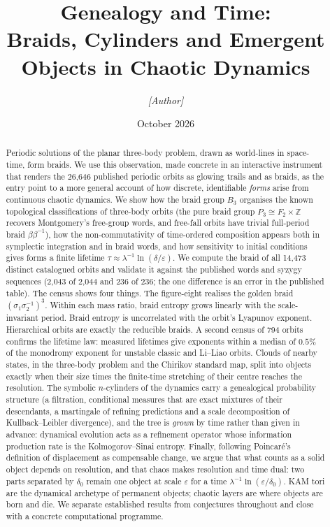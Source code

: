 \documentclass[11pt]{article}
\title{Genealogy and Time:\\[4pt]
\large Braids, Cylinders and Emergent Objects in Chaotic Dynamics}
\author{\textit{[Author]}}
\date{October 2026}
\theoremstyle{remark}
\newcommand{\Z}{\mathbb{Z}}
\begin{document}
\maketitle

\begin{abstract}
Periodic solutions of the planar three-body problem, drawn as world-lines in space-time, form braids.
We use this observation, made concrete in an interactive instrument that renders the 26{,}646 published
periodic orbits as glowing trails and as braids, as the entry point to a more general account of how
discrete, identifiable \emph{forms} arise from continuous chaotic dynamics.
We show how the braid group $B_3$ organises the known topological classifications of three-body orbits
(the pure braid group $P_3\cong F_2\times\Z$ recovers Montgomery's free-group words, and free-fall orbits
have trivial full-period braid $\beta\beta^{-1}$), how the non-commutativity of time-ordered composition
appears both in symplectic integration and in braid words, and how sensitivity to initial conditions gives
forms a finite lifetime $\tau\approx\lambda^{-1}\ln(\delta/\varepsilon)$.
We compute the braid of all 14{,}473 distinct catalogued orbits and validate it against the published words and
syzygy sequences (2{,}043 of 2{,}044 and 236 of 236; the one difference is an error in the published table).
The census shows four things. The figure-eight realises the golden braid $(\sigma_1\sigma_2^{-1})^3$. Within each
mass ratio, braid entropy grows linearly with the scale-invariant period. Braid entropy is uncorrelated with the
orbit's Lyapunov exponent. Hierarchical orbits are exactly the reducible braids.
A second census of 794 orbits confirms the lifetime law: measured lifetimes give exponents within a median of
$0.5\%$ of the monodromy exponent for unstable classic and Li--Liao orbits.
Clouds of nearby states, in the three-body problem and the Chirikov standard map, split into objects exactly when
their size times the finite-time stretching of their centre reaches the resolution.
The symbolic $n$-cylinders of the dynamics carry a genealogical probability structure (a filtration,
conditional measures that are exact mixtures of their descendants, a martingale of refining predictions and
a scale decomposition of Kullback--Leibler divergence), and the tree is \emph{grown} by time rather than
given in advance: dynamical evolution acts as a refinement operator whose information production rate is the
Kolmogorov--Sinai entropy. Finally, following Poincar\'e's definition of displacement as compensable change,
we argue that what counts as a solid object depends on resolution, and that chaos makes resolution and time
dual: two parts separated by $\delta_0$ remain one object at scale $\varepsilon$ for a time
$\lambda^{-1}\ln(\varepsilon/\delta_0)$. KAM tori are the dynamical archetype of permanent objects; chaotic
layers are where objects are born and die. We separate established results from conjectures throughout and
close with a concrete computational programme.
\end{abstract}
\end{document}
